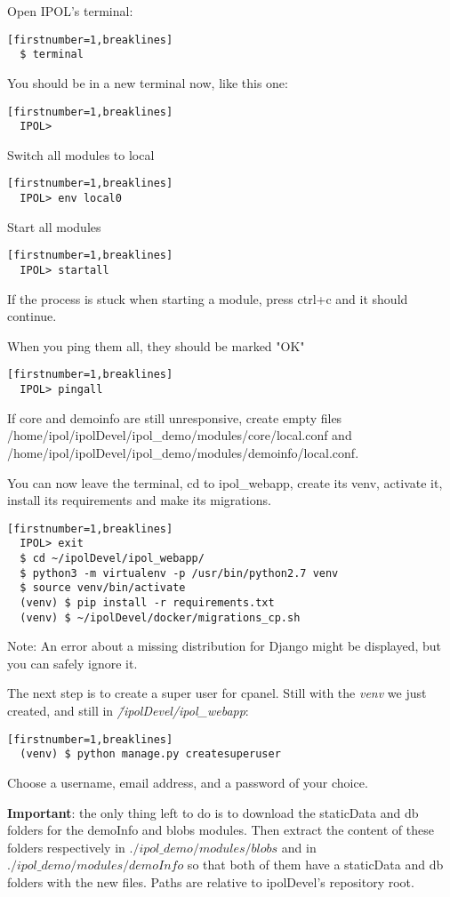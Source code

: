 \documentclass[a4paper,12pt]{article}
\begin{document}
Open IPOL's terminal:
\begin{verbatim}[firstnumber=1,breaklines]
  $ terminal
\end{verbatim}

You should be in a new terminal now, like this one:
\begin{verbatim}[firstnumber=1,breaklines]
  IPOL>
\end{verbatim}

Switch all modules to local
\begin{verbatim}[firstnumber=1,breaklines]
  IPOL> env local0
\end{verbatim}

Start all modules
\begin{verbatim}[firstnumber=1,breaklines]
  IPOL> startall
\end{verbatim}
If the process is stuck when starting a module, press ctrl+c and it should continue.

When you ping them all, they should be marked "OK"
\begin{verbatim}[firstnumber=1,breaklines]
  IPOL> pingall
\end{verbatim}
If core and demoinfo are still unresponsive, create empty files /home/ipol/ipolDevel/ipol_demo/modules/core/local.conf and /home/ipol/ipolDevel/ipol_demo/modules/demoinfo/local.conf.

You can now leave the terminal, cd to ipol\_webapp, create its venv, activate it, install its 
requirements and make its migrations.
\begin{verbatim}[firstnumber=1,breaklines]
  IPOL> exit
  $ cd ~/ipolDevel/ipol_webapp/
  $ python3 -m virtualenv -p /usr/bin/python2.7 venv
  $ source venv/bin/activate
  (venv) $ pip install -r requirements.txt
  (venv) $ ~/ipolDevel/docker/migrations_cp.sh
\end{verbatim}

Note: An error about a missing distribution for Django might be displayed, but you can safely ignore it.

The next step is to create a super user for cpanel. Still with the \emph{venv} we just created, and
still in \emph{\~/ipolDevel/ipol\_webapp}:
\begin{verbatim}[firstnumber=1,breaklines]
  (venv) $ python manage.py createsuperuser
\end{verbatim}

Choose a username, email address, and a password of your choice.

\textbf{Important}: the only thing left to do is to download the staticData and db folders for the demoInfo
and blobs modules. 
Then extract the content of these folders respectively in \emph{$./ipol\_demo/modules/blobs$}
and in \emph{$./ipol\_demo/modules/demoInfo$} so that both of them have a staticData and db folders
with the new files. Paths are relative to ipolDevel's repository root.
\end{document}
